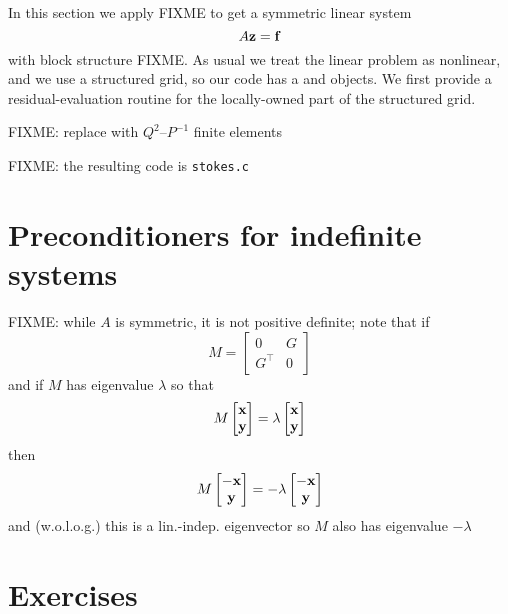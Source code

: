 In this section we apply FIXME to get a symmetric linear system
\begin{equation}
  A \mathbf{z} = \mathbf{f} \label{eq:ok:linsysstokes}
\end{equation}
with block structure FIXME.  As usual we treat the linear problem as nonlinear, and we use a structured grid, so our code has a \pSNES and \pDMDA objects.  We first provide a residual-evaluation routine for the locally-owned part of the structured grid.

FIXME: replace with $Q^2$--$P^{-1}$ finite elements


FIXME: the resulting code is \texttt{stokes.c}


\section{Preconditioners for indefinite systems}

FIXME: while $A$ is symmetric, it is not positive definite; note that if
    $$M = \begin{bmatrix} 0 & G \\ G^\top & 0 \end{bmatrix}$$
and if $M$ has eigenvalue $\lambda$ so that
    $$M \begin{bmatrix} \mathbf{x} \\ \mathbf{y} \end{bmatrix} = \lambda \begin{bmatrix} \mathbf{x} \\ \mathbf{y} \end{bmatrix}$$
then
    $$M \begin{bmatrix} -\mathbf{x} \\ \mathbf{y} \end{bmatrix} = - \lambda \begin{bmatrix} -\mathbf{x} \\ \mathbf{y} \end{bmatrix}$$
and (w.o.l.o.g.) this is a lin.-indep. eigenvector so $M$ also has eigenvalue $-\lambda$


\section{Exercises}

